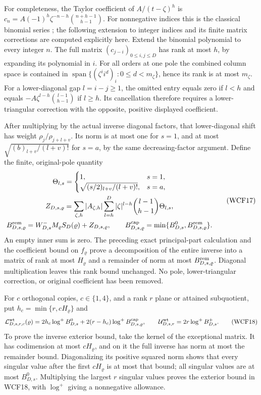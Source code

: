 For completeness, the Taylor coefficient of $A/(t-\zeta)^h$ is
$c_n=A(-1)^h\zeta^{-n-h}\binom{n+h-1}{h-1}$.
For nonnegative indices this is the classical binomial series
\cite[eq.~(1.10.4)]{human:dlmf1}; the following extension to integer
indices and its finite matrix corrections are computed explicitly here.
Extend the binomial polynomial to every integer $n$. The full matrix
$(c_{j-i})_{0\le i,j\le D}$ has rank at most $h$, by expanding its
polynomial in $i$. For all orders at one pole the combined column
space is contained in $\operatorname{span}\{(\zeta^ii^d)_i:
0\le d<m_\zeta\}$, hence its rank is at most $m_\zeta$.
For a lower-diagonal gap $l=i-j\ge1$, the omitted entry equals
zero if $l<h$ and equals
$-A\zeta^{l-h}\binom{l-1}{h-1}$ if $l\ge h$.
Its cancellation therefore requires a lower-triangular correction with
the opposite, positive displayed coefficient.

After multiplying by the actual inverse diagonal factors, that
lower-diagonal shift has weight $\rho_j/\rho_{j+l+v}$. Its norm is
at most one for $s=1$, and at most
$\sqrt{(b)_{l+v}/(l+v)!}$ for $s=a$, by the same decreasing-factor
argument. Define the finite, original-pole quantity
\[
\begin{gathered}
 \Theta_{l,s}=\begin{cases}1,&s=1,\\
       \sqrt{(s/2)_{l+v}/(l+v)!},&s=a,\end{cases}\\
 Z_{D,s,\varrho}=\sum_{\zeta,h}|A_{\zeta,h}|
      \sum_{l=h}^{D}|\zeta|^{l-h}\binom{l-1}{h-1}\Theta_{l,s},\\
 B^{\rm rem}_{D,s,\varrho}=W_{D,s}^-M_\varrho S_D(\varrho)
                              +Z_{D,s,\varrho},\qquad
 B^{\rm cap}_{D,s,\varrho}
     =\min\{B^0_{D,s},B^{\rm rem}_{D,s,\varrho}\}.
\end{gathered}\tag{WCF17}
\]
An empty inner sum is zero. The preceding exact principal-part
calculation and the coefficient bound on $f_\varrho$ prove a decomposition
of the entire inverse into a matrix of rank at most $H_\varrho$ and
a remainder of norm at most $B^{\rm rem}_{D,s,\varrho}$.
Diagonal multiplication leaves this rank bound unchanged. No pole,
lower-triangular correction, or original coefficient has been removed.

For $c$ orthogonal copies, $c\in\{1,4\}$, and a rank $r$ plane or
attained subquotient, put $h_c=\min\{r,cH_\varrho\}$ and
\[
 \mathcal L^{\rm wt}_{D,s,r,c}(\varrho)
 =2h_c\log^+B^0_{D,s}
       +2(r-h_c)\log^+B^{\rm cap}_{D,s,\varrho},\qquad
 \mathcal U^{\rm wt}_{D,s,r}=2r\log^+B^+_{D,s}.
 \tag{WCF18}
\]
To prove the inverse exterior bound, take the kernel of the exceptional
matrix. It has codimension at most $cH_\varrho$, and on it the full
inverse has norm at most the remainder bound. Diagonalizing its positive
squared norm shows that every singular value after the first
$cH_\varrho$ is at most that bound; all singular values are at most
$B^0_{D,s}$. Multiplying the largest $r$ singular values proves the
exterior bound in WCF18, with $\log^+$ giving a nonnegative allowance.

